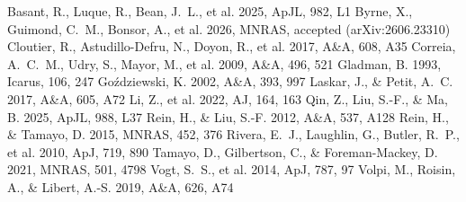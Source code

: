 \documentclass[twocolumn]{aastex631}
\begin{document}

\begin{thebibliography}{}
 Basant, R., Luque, R., Bean,
J.~L., et al. 2025, ApJL, 982, L1
 Byrne, X., Guimond, C.~M.,
Bonsor, A., et al. 2026, MNRAS, accepted (arXiv:2606.23310)
 Cloutier, R.,
Astudillo-Defru, N., Doyon, R., et al. 2017, A\&A, 608, A35
 Correia, A.~C.~M., Udry, S.,
Mayor, M., et al. 2009, A\&A, 496, 521
 Gladman, B. 1993, Icarus, 106, 247
 Go\'zdziewski, K. 2002,
A\&A, 393, 997
 Laskar, J., \& Petit,
A.~C. 2017, A\&A, 605, A72
 Li, Z., et al. 2022, AJ, 164, 163
 Qin, Z., Liu, S.-F., \& Ma, B. 2025,
ApJL, 988, L37
 Rein, H., \& Liu, S.-F. 2012,
A\&A, 537, A128
 Rein, H., \& Tamayo, D.
2015, MNRAS, 452, 376
 Rivera, E.~J., Laughlin, G.,
Butler, R.~P., et al. 2010, ApJ, 719, 890
 Tamayo, D., Gilbertson, C., \&
Foreman-Mackey, D. 2021, MNRAS, 501, 4798
 Vogt, S.~S., et al. 2014, ApJ,
787, 97
 Volpi, M., Roisin, A., \& Libert,
A.-S. 2019, A\&A, 626, A74
\end{thebibliography}
\end{document}
